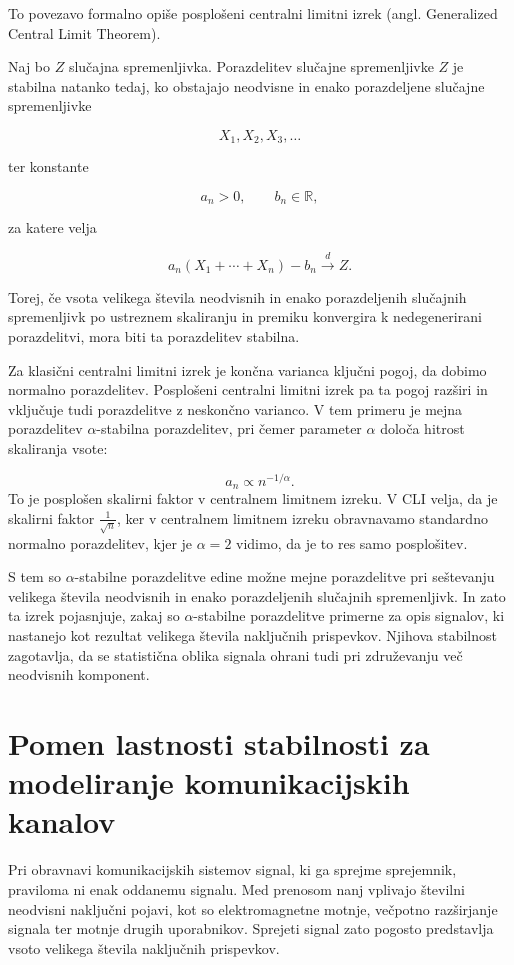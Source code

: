 \documentclass[a4paper, 12pt, openany]{book}
\begin{document}
To povezavo formalno opiše posplošeni centralni limitni izrek (angl. Generalized Central Limit Theorem). 

\begin{tcolorbox}[colback=blue!5!white,colframe=blue!50!black, title=Definicija 6: Posplošeni centralni limitni izrek]
\label{def:GCLI}
Naj bo $Z$ slučajna spremenljivka. Porazdelitev slučajne spremenljivke $Z$ je stabilna natanko tedaj, ko obstajajo neodvisne in enako porazdeljene slučajne spremenljivke

\[
X_1,X_2,X_3,\dots
\]

ter konstante

\[
a_n>0,\qquad b_n\in\mathbb{R},
\]

za katere velja

\[
a_n(X_1+\cdots+X_n)-b_n
\overset{d}{\longrightarrow}
Z.
\]
\end{tcolorbox}
\begin{tcolorbox}[colback=yellow!5!white, colframe=orange!70!black, title=\textbf{Intuicija}, fonttitle=\bfseries]
Torej, če vsota velikega števila neodvisnih in enako porazdeljenih slučajnih spremenljivk po ustreznem skaliranju in premiku konvergira k nedegenerirani porazdelitvi, mora biti ta porazdelitev stabilna.
\end{tcolorbox}

Za klasični centralni limitni izrek je končna varianca ključni pogoj, da dobimo normalno porazdelitev. Posplošeni centralni limitni izrek pa ta pogoj razširi in vključuje tudi porazdelitve z neskončno varianco. V tem primeru je mejna porazdelitev $\alpha$-stabilna porazdelitev, pri čemer parameter $\alpha$ določa hitrost skaliranja vsote:

\[
a_n \propto n^{-1/\alpha}.
\]
To je posplošen skalirni faktor v centralnem limitnem izreku. V CLI velja, da je skalirni faktor $\frac{1}{\sqrt{n}}$, ker v centralnem limitnem izreku obravnavamo standardno normalno porazdelitev, kjer je $\alpha = 2$ vidimo, da je to res samo posplošitev.

S tem so $\alpha$-stabilne porazdelitve edine možne mejne porazdelitve pri seštevanju velikega števila neodvisnih in enako porazdeljenih slučajnih spremenljivk. In zato ta izrek pojasnjuje, zakaj so $\alpha$-stabilne porazdelitve primerne za opis signalov, ki nastanejo kot rezultat velikega števila naključnih prispevkov. Njihova stabilnost zagotavlja, da se statistična oblika signala ohrani tudi pri združevanju več neodvisnih komponent.

\section{Pomen lastnosti stabilnosti za modeliranje komunikacijskih kanalov}
Pri obravnavi komunikacijskih sistemov signal, ki ga sprejme sprejemnik, praviloma ni enak oddanemu signalu. Med prenosom nanj vplivajo številni neodvisni naključni pojavi, kot so elektromagnetne motnje, večpotno razširjanje signala ter motnje drugih uporabnikov. Sprejeti signal zato pogosto predstavlja vsoto velikega števila naključnih prispevkov.
\end{document}
